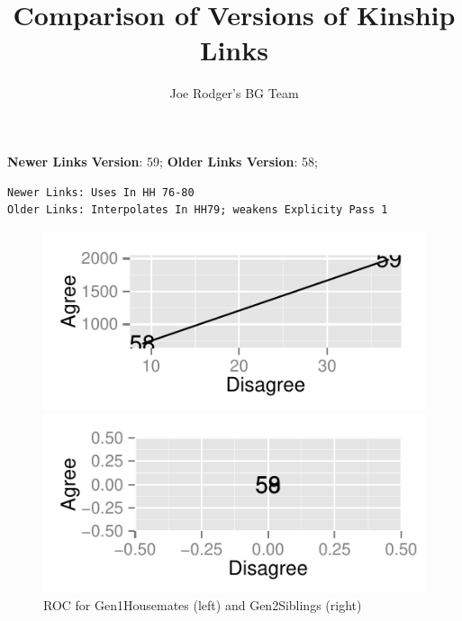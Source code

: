 \documentclass[a4paper]{article}\usepackage{graphicx, color}
\title{Comparison of Versions of Kinship Links}
\author{Joe Rodger's BG Team}
\makeatletter
\def\maxwidth{ %
  \ifdim\Gin@nat@width>\linewidth
    \linewidth
  \else
    \Gin@nat@width
  \fi
}
\newenvironment{kframe}{%
 \def\at@end@of@kframe{}%
 \ifinner\ifhmode%
  \def\at@end@of@kframe{\end{minipage}}%
  \begin{minipage}{\columnwidth}%
 \fi\fi%
 \def\FrameCommand##1{\hskip\@totalleftmargin \hskip-\fboxsep
 \colorbox{shadecolor}{##1}\hskip-\fboxsep
     \hskip-\linewidth \hskip-\@totalleftmargin \hskip\columnwidth}%
 \MakeFramed {\advance\hsize-\width
   \@totalleftmargin\z@ \linewidth\hsize
   \@setminipage}}%
 {\par\unskip\endMakeFramed%
 \at@end@of@kframe}
\newenvironment{knitrout}{}{} %
\makeatother
\begin{document}
\maketitle

\setlength{\parindent}{0pt}%







\textbf{Newer Links Version}: 59;
\textbf{Older Links Version}: 58;

\begin{knitrout}
\color{fgcolor}\begin{kframe}
\begin{verbatim}
Newer Links: Uses In HH 76-80
Older Links: Interpolates In HH79; weakens Explicity Pass 1
\end{verbatim}
\end{kframe}
\end{knitrout}


\begin{figure}[htbp]
\begin{knitrout}
\color{fgcolor}
\includegraphics[width=\maxwidth]{figure/unnamed-chunk-31} 

\includegraphics[width=\maxwidth]{figure/unnamed-chunk-32} 

\end{knitrout}

\caption{ROC for Gen1Housemates (left) and Gen2Siblings (right)}
\end{figure}
\end{document}
